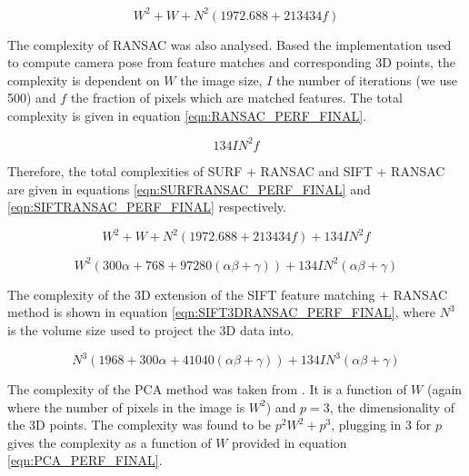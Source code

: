 \begin{equation} \label{eqn:SURF_PERF_FINAL}
W^2 + W + N^2(1972.688 + 213434f)
\end{equation}

The complexity of RANSAC was also analysed. Based the implementation used to compute camera pose from feature matches and corresponding 3D points, the complexity is dependent on $W$ the image size, $I$ the number of iterations (we use 500) and $f$ the fraction of pixels which are matched features. The total complexity is given in equation \ref{eqn:RANSAC_PERF_FINAL}.

\begin{equation} \label{eqn:RANSAC_PERF_FINAL}
134IN^2f
\end{equation}

Therefore, the total complexities of SURF + RANSAC and SIFT + RANSAC are given in equations \ref{eqn:SURFRANSAC_PERF_FINAL} and \ref{eqn:SIFTRANSAC_PERF_FINAL} respectively.


\begin{equation} \label{eqn:SURFRANSAC_PERF_FINAL}
W^2 + W + N^2(1972.688 + 213434f) + 134IN^2f
\end{equation}

\begin{equation} \label{eqn:SIFTRANSAC_PERF_FINAL}
W^2(300\alpha + 768 + 97280(\alpha \beta + \gamma)) + 134IN^2(\alpha \beta + \gamma)
\end{equation}


The complexity of the 3D extension of the SIFT feature matching + RANSAC method  is shown in equation \ref{eqn:SIFT3DRANSAC_PERF_FINAL}, where $N^3$ is the volume size used to project the 3D data into.

\begin{equation} \label{eqn:SIFT3DRANSAC_PERF_FINAL}
N^3(1968 + 300\alpha + 41040(\alpha \beta + \gamma)) + 134IN^3(\alpha \beta + \gamma)
\end{equation}

The complexity of the PCA method was taken from \cite{Johnstone04Sparse}. It is a function of $W$ (again where the number of pixels in the image is $W^2$) and $p = 3$, the dimensionality of the 3D points. The complexity was found to be $p^2W^2+p^3$, plugging in 3 for $p$ gives the complexity as a function of $W$ provided in equation \ref{eqn:PCA_PERF_FINAL}.

